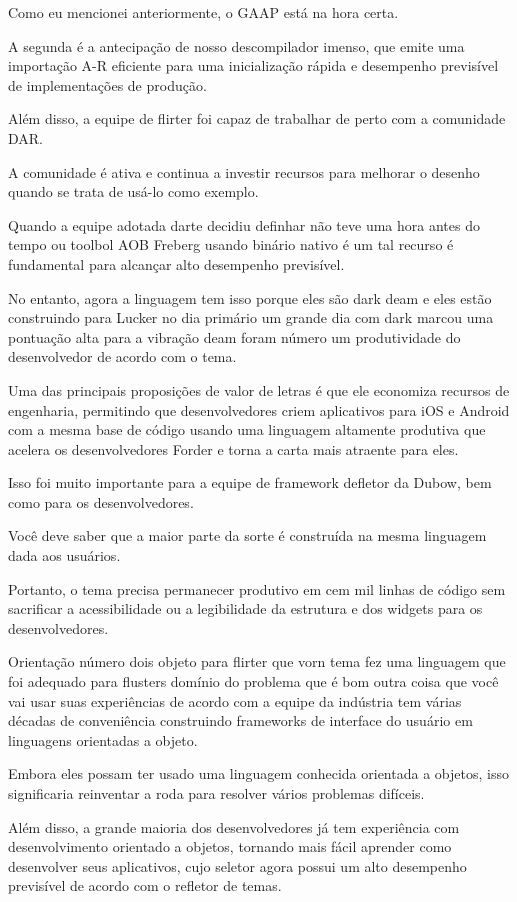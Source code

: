 Como eu mencionei anteriormente, o GAAP está na hora certa.

A segunda é a antecipação de nosso descompilador imenso, que emite uma importação A-R eficiente para uma inicialização rápida e desempenho previsível de implementações de produção.

Além disso, a equipe de flirter foi capaz de trabalhar de perto com a comunidade DAR.

A comunidade é ativa e continua a investir recursos para melhorar o desenho quando se trata de usá-lo como exemplo.

Quando a equipe adotada darte decidiu definhar não teve uma hora antes do tempo ou toolbol AOB Freberg usando binário nativo é um tal recurso é fundamental para alcançar alto desempenho previsível.

No entanto, agora a linguagem tem isso porque eles são dark deam e eles estão construindo para Lucker no dia primário um grande dia com dark marcou uma pontuação alta para a vibração deam foram número um produtividade do desenvolvedor de acordo com o tema.

Uma das principais proposições de valor de letras é que ele economiza recursos de engenharia, permitindo que desenvolvedores criem aplicativos para iOS e Android com a mesma base de código usando uma linguagem altamente produtiva que acelera os desenvolvedores Forder e torna a carta mais atraente para eles.

Isso foi muito importante para a equipe de framework defletor da Dubow, bem como para os desenvolvedores.

Você deve saber que a maior parte da sorte é construída na mesma linguagem dada aos usuários.

Portanto, o tema precisa permanecer produtivo em cem mil linhas de código sem sacrificar a acessibilidade ou a legibilidade da estrutura e dos widgets para os desenvolvedores.

Orientação número dois objeto para flirter que vorn tema fez uma linguagem que foi adequado para flusters domínio do problema que é bom outra coisa que você vai usar suas experiências de acordo com a equipe da indústria tem várias décadas de conveniência construindo frameworks de interface do usuário em linguagens orientadas a objeto.

Embora eles possam ter usado uma linguagem conhecida orientada a objetos, isso significaria reinventar a roda para resolver vários problemas difíceis.

Além disso, a grande maioria dos desenvolvedores já tem experiência com desenvolvimento orientado a objetos, tornando mais fácil aprender como desenvolver seus aplicativos, cujo seletor agora possui um alto desempenho previsível de acordo com o refletor de temas.

